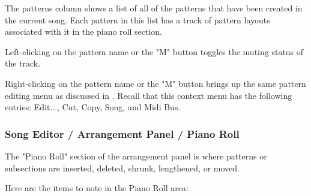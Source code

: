    The patterns column shows a list of all of the patterns that have been
   created in the current song.  Each pattern in this list has a track of
   pattern layouts associated with it in the piano roll section.

   Left-clicking on the pattern name or the "M" button toggles the muting
   status of the track.

   Right-clicking on the pattern name or the "M" button brings up the same
   pattern editing menu as discussed in
   .
   Recall that this context menu has the following entries:
   Edit..., Cut, Copy, Song, and Midi Bus.

\subsubsection{Song Editor / Arrangement Panel / Piano Roll}
\label{subsubsec:seq24_song_editor_arrangement_panel_roll}

   The "Piano Roll" section of the arrangement panel is where patterns or
   subsections are inserted, deleted, shrunk, lengthened, or moved.

   Here are the items to note in the Piano Roll area:

